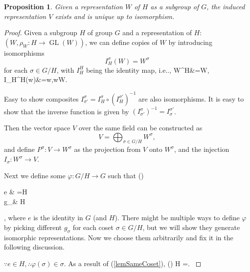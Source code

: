\documentclass[12pt, letterpaper]{article}
\makeatletter
\newcommand{\GL}{\operatorname{GL}}
\newcommand\ie{i.e\@ifnextchar.{}{.\@}}
\newcommand{\define}{\coloneqq}
\newenvironment{eqlong}{\equation\aligned}{\endaligned\endequation}
\newtheorem{prop}{Proposition}[section]
\theoremstyle{definition}
\theoremstyle{remark}
\theoremstyle{definition}
\theoremstyle{plain}
\numberwithin{equation}{section}
\makeatother
\begin{document}
	\begin{prop}
		Given a representation $W$ of $H$ as a subgroup of $G$, the induced representation $V$ exists and is unique 
		up to isomorphism.
	\end{prop}
	\begin{proof}
		Given a subgroup $H$ of group $G$
		and a representation of $H$: $(W,\rho_W\colon H\to\GL(W))$,
		we can define copies of $W$ by introducing isomorphisms
		\[I_H^\sigma(W)=W^{\sigma}\] for each $\sigma\in G/H$, with $I_H^H$ being the identity map,
		\ie, \begin{eqlong}\label{eqIHHidm}
			W^H&=W,\\ I_H^H(w)&=w,\forall w\in W.\\
		\end{eqlong}
		
		Easy to show composites $I_{\sigma'}^{\sigma}= I_{H}^{\sigma}\circ\left( I_{H}^{\sigma'}\right)^{-1}$ are also isomorphisms.
		It is easy to show that
		the inverse function is given by $\left( I_{\sigma'}^{\sigma}\right)^{-1} =I_{\sigma}^{\sigma'}$.
		
		Then the vector space $V$ over the same field can be constructed as
		\[V=\bigoplus_{\sigma\in G/H}W^{\sigma},\]
		and define $P^{\sigma}\colon V\to W^{\sigma}$ as the projection from $V$ onto $W^\sigma$,
		and the injection $I_{\sigma}\colon W^{\sigma}\to V$.
				
		Next we define 
		 some $\varphi \colon G/H \to G$ such that
		\begin{eqlong}\label{eqVarphiSigma}
		\varphi(\sigma)\define
		\begin{cases} 
			e & \sigma=H \\
			g_\sigma\in\sigma & \sigma\ne H \\
		\end{cases},
		\end{eqlong}
		where $e$ is the identity in $G$ (and $H$).
		There might be multiple ways to define $\varphi$ by picking different $g_\sigma$ for each coset $\sigma\in G/H$,
		but we will show they generate isomorphic representations.
		Now we choose them arbitrarily and fix it in the following discussion.
		
		$\because e\in H,\therefore \varphi(\sigma)\in\sigma$.
		As a result of (\ref{lemSameCoset}),
		\begin{eqlong}\label{eqVarphiSigmaH}
			\varphi(\sigma) H =\sigma.
		\end{eqlong}
		

\end{proof}
\end{document}
